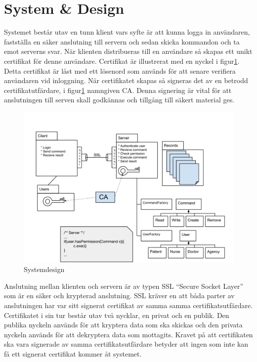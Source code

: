 \documentclass[titlepage,a4paper]{article}
\begin{document}
\section{System \& Design}
Systemet består utav en tunn klient vars syfte är att kunna logga in användaren, fastställa en säker anslutning till servern och sedan skicka kommandon och ta emot serverns svar. När klienten distribueras till en användare så skapas ett unikt certifikat för denne användare. Certifikat är illustrerat med en nyckel i figur\ref{design}. Detta certifikat är låst med ett lösenord som används för att senare verifiera användaren vid inloggning. När certifikatet skapas så signeras det av en betrodd certifikatutfärdare, i figur\ref{design} namngiven CA. Denna signering är vital för att anslutningen till serven skall godkännas och tillgång till säkert material ges.
\begin{figure}[!h]
\includegraphics[width=\textwidth]{Design.png}
\caption{Systemdesign}
\label{design}
\end{figure}
Anslutning mellan klienten och servern är av typen SSL “Secure Socket Layer” som är en säker och krypterad anslutning. SSL kräver en att båda parter av anslutningen har var sitt signerat certifikat av samma samma certifikatsutfärdare. Certifikatet i sin tur består utav två nycklar, en privat och en publik. Den publika nyckeln används för att kryptera data som ska skickas och den privata nyckeln används för att dekryptera data som mottagits. Kravet på att certifikaten ska vara signerade av samma certifikatsutfärdare betyder att ingen som inte kan få ett signerat certifikat kommer åt systemet.
\end{document}
